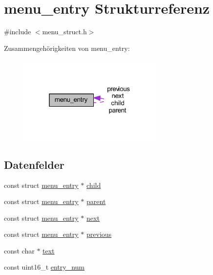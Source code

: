 \hypertarget{structmenu__entry}{}\section{menu\+\_\+entry Strukturreferenz}
\label{structmenu__entry}


{\ttfamily \#include $<$menu\+\_\+struct.\+h$>$}



Zusammengehörigkeiten von menu\+\_\+entry\+:\nopagebreak
\begin{figure}[H]
\begin{center}
\leavevmode
\includegraphics[width=205pt]{structmenu__entry__coll__graph}
\end{center}
\end{figure}
\subsection*{Datenfelder}
\begin{DoxyCompactItemize}
\item 
const struct \hyperlink{structmenu__entry}{menu\+\_\+entry} $\ast$ \hyperlink{structmenu__entry_afb8f7c977abd9b84c48a00c204aad77b}{child}
\item 
const struct \hyperlink{structmenu__entry}{menu\+\_\+entry} $\ast$ \hyperlink{structmenu__entry_ac1b562fabcc9402003931e8351d6faf7}{parent}
\item 
const struct \hyperlink{structmenu__entry}{menu\+\_\+entry} $\ast$ \hyperlink{structmenu__entry_a8667330bb5cb56772e88abd901064211}{next}
\item 
const struct \hyperlink{structmenu__entry}{menu\+\_\+entry} $\ast$ \hyperlink{structmenu__entry_a66676e2c3f7553b50a8c1d0c4e973734}{previous}
\item 
const char $\ast$ \hyperlink{structmenu__entry_a16343090e80c4472521560f30113d96c}{text}
\item 
const uint16\+\_\+t \hyperlink{structmenu__entry_aead51ebe631627145d52a84b2d92e240}{entry\+\_\+num}
\end{DoxyCompactItemize}


